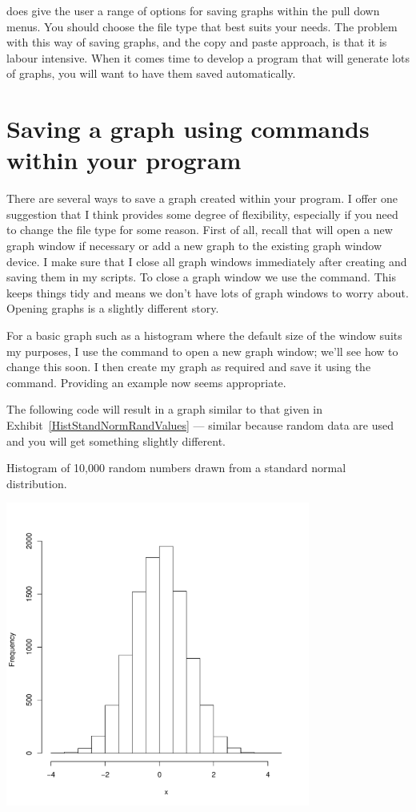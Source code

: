 \R{} does give the user a range of options for saving graphs within the pull down menus. You should choose the file type that best suits your needs. The problem with this way of saving graphs, and the copy and paste approach, is that it is labour intensive. When it comes time to develop a program that will generate lots of graphs, you will want to have them saved automatically. 
 
\section{Saving a graph using commands within your \R{} program} 
 
There are several ways to save a graph created within your \R{} program. I offer one suggestion that I think provides some degree of flexibility, especially if you need to change the file type for some reason. First of all, recall that \R{} will open a new graph window if necessary or add a new graph to the existing graph window device. I make sure that I close all graph windows immediately after creating and saving them in my \R{} scripts. To close a graph window we use the  command. This keeps things tidy and means we don't have lots of graph windows to worry about. Opening graphs is a slightly different story. 
 
For a basic graph such as a histogram where the default size of the window suits my purposes, I use the  command to open a new graph window; we'll see how to change this soon. I then create my graph as required and save it using the  command. Providing an example now seems appropriate.  
 
The following code will result in a graph similar to that given in Exhibit~\ref{HistStandNormRandValues} --- similar because random data are used and you will get something slightly different.\begin{exhibit} 
\begin{center} 
\caption{Histogram of 10,000 random numbers drawn from a standard normal distribution. \label{HistStandNormRandValues}} 
\includegraphics[width=10cm]{figures/StoreResultsHistRand10000Z-1} 
\end{center} 
\end{exhibit} 


